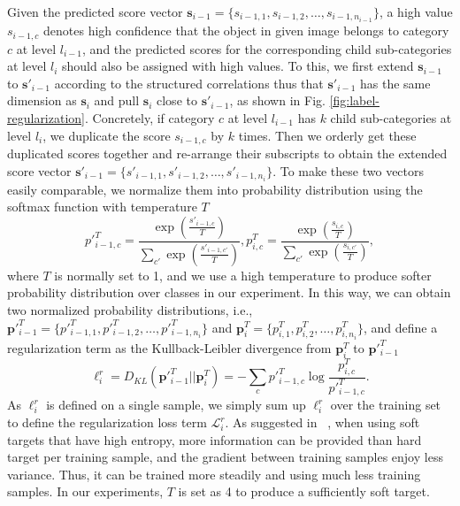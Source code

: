 \documentclass[sigconf]{acmart}
\begin{document}
Given the predicted score vector $\mathbf{s}_{i-1}=\{s_{i-1,1}, s_{i-1,2}, \dots, s_{i-1,n_{i-1}}\}$, a high value $s_{i-1, c}$ denotes high confidence that the object in given image belongs to category $c$ at level $l_{i-1}$, and the predicted scores for the corresponding child sub-categories at level $l_i$ should also be assigned with high values. To this, we first extend $\mathbf{s}_{i-1}$ to $\mathbf{s}'_{i-1}$ according to the structured correlations thus that $\mathbf{s}'_{i-1}$ has the same dimension as $\mathbf{s}_i$ and pull $\mathbf{s}_i$ close to $\mathbf{s}'_{i-1}$, as shown in Fig. \ref{fig:label-regularization}. Concretely, if category $c$ at level $l_{i-1}$ has $k$ child sub-categories at level $l_i$, we duplicate the score $s_{i-1, c}$ by $k$ times. Then we orderly get these duplicated scores together and re-arrange their subscripts to obtain the extended score vector $\mathbf{s}'_{i-1}=\{s'_{i-1,1}, s'_{i-1,2}, \dots, s'_{i-1,n_{i}}\}$. To make these two vectors easily comparable, we normalize them into probability distribution using the softmax function with temperature $T$
\begin{equation}
    {p}'^T_{i-1,c}=\frac{\exp(\frac{s'_{i-1,c}}{T})}{\sum_{c'}{\exp(\frac{s'_{i-1,c'}}{T})}}, 
    p^T_{i,c}=\frac{\exp(\frac{s_{i,c}}{T})}{\sum_{c'}{\exp(\frac{s_{i,c'}}{T})}},
\end{equation}
where $T$ is normally set to 1, and we use a high temperature to produce softer probability distribution over classes in our experiment. In this way, we can obtain two normalized probability distributions, i.e., $\mathbf{p}'^T_{i-1}=\{{p}'^T_{i-1,1}, {p}'^T_{i-1,2}, \dots, {p}'^T_{i-1,n_{i}}\}$ and $\mathbf{p}^T_{i}=\{p^T_{i,1}, p^T_{i,2}, \dots, p^T_{i,n_{i}}\}$, and define a regularization term as the Kullback-Leibler divergence from $\mathbf{p}^T_i$ to $\mathbf{p}'^T_{i-1}$
\begin{equation}
    \ell_i^r=D_{KL}(\mathbf{p}'^T_{i-1} || \mathbf{p}^T_i)=-\sum_{c}{p}'^T_{i-1, c}\log{\frac{p^T_{i, c}}{{p}'^T_{i-1, c}}}.
\end{equation}
As $\ell_i^r$ is defined on a single sample, we simply sum up $\ell_i^r$ over the training set to define the regularization loss term $\mathcal{L}_i^r$. As suggested in ~\cite{hinton2015distilling}, when using soft targets that have high entropy, more information can be provided than hard target per training sample, and the gradient between training samples enjoy less variance. Thus, it can be trained more steadily and using much less training samples. In our experiments, $T$ is set as 4 to produce a sufficiently soft target.
\end{document}
